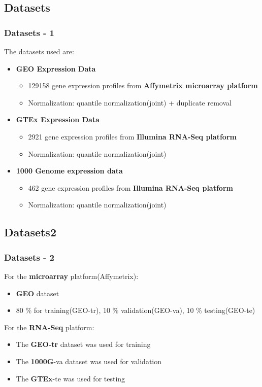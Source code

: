 \documentclass[professionalfont]{beamer}
\begin{document}
  \subsection{Datasets}
	\begin{frame}
	  \frametitle{Datasets - 1}
	  The datasets used are: \newline
    \begin{itemize}
      \item \textbf{GEO Expression Data}
      \begin{itemize}
        \item 129158 gene expression profiles from \textbf{Affymetrix microarray platform}
        \item Normalization: quantile normalization(joint) + duplicate removal
      \end{itemize}

      \item \textbf{GTEx Expression Data}
      \begin{itemize}
        \item 2921 gene expression profiles from \textbf{Illumina RNA-Seq platform}
        \item Normalization: quantile normalization(joint)
      \end{itemize}

      \item \textbf{1000 Genome expression data}
      \begin{itemize}
        \item 462 gene expression profiles from \textbf{Illumina RNA-Seq platform}
        \item Normalization: quantile normalization(joint)
      \end{itemize}
    \end{itemize}
	\end{frame}


  \subsection{Datasets2}
	\begin{frame}
    \frametitle{Datasets - 2}
    For the \textbf{microarray} platform(Affymetrix):
    \begin{itemize}
      \item \textbf{GEO} dataset
      \item 80 \% for training(GEO-tr), 10 \% validation(GEO-va), 10 \% testing(GEO-te)
    \end{itemize}
    \vspace{0.5cm}
    For the \textbf{RNA-Seq} platform:
    \begin{itemize}
      \item The \textbf{GEO-tr} dataset was used for training
      \item The \textbf{1000G}-va dataset was used for validation
      \item The \textbf{GTEx}-te was used for testing
    \end{itemize}
  \end{frame}
\end{document}
